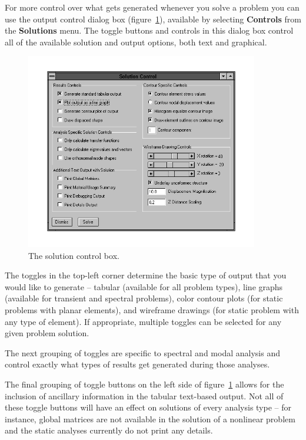 For more control over what gets generated whenever you solve a problem
you can use the output control dialog box (figure~\ref{winfelt.controls}), 
available by selecting {\bf Controls} from the {\bf Solutions} menu.  
The toggle buttons and controls in this dialog box control all of the available
solution and output options, both text and graphical.   
%
\begin{figure}
\begin{center}
 \includegraphics[width=4in]{figures/winfelt_controls}
\end{center}
\caption{The solution control box.}
\label{winfelt.controls}
\end{figure}

The toggles in the top-left corner determine the basic type of output
that you would like to generate -- tabular (available for all problem
types), line graphs (available for transient and spectral problems),
color contour plots (for static problems with planar elements), and
wireframe drawings (for static problem with any type of element).
If appropriate, multiple toggles can be selected for any given 
problem solution.

The next grouping of toggles are specific to spectral and modal analysis
and control exactly what types of results get generated during those
analyses.  

The final grouping of toggle buttons on the left side of 
figure~\ref{winfelt.controls} allows for the inclusion of 
ancillary information in the tabular text-based output.  Not all
of these toggle buttons will have an effect on solutions of
every analysis type -- for instance, global matrices are not
available in the solution of a nonlinear problem and the static
analyses currently do not print any details.

